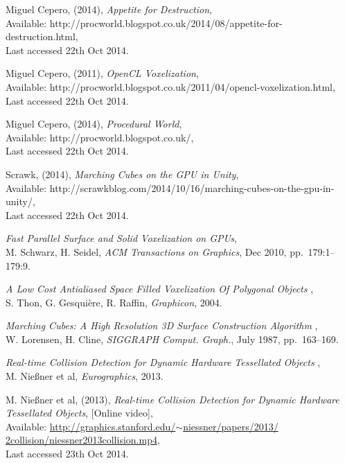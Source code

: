 
\begin{thebibliography}{99}



 Miguel Cepero, (2014), \emph{Appetite for Destruction},\\ Available: http://procworld.blogspot.co.uk/2014/08/appetite-for-destruction.html,\\ Last accessed 22th Oct 2014.

 Miguel Cepero, (2011), \emph{OpenCL Voxelization},\\ Available: http://procworld.blogspot.co.uk/2011/04/opencl-voxelization.html,\\ Last accessed 22th Oct 2014.

 Miguel Cepero, (2014), \emph{Procedural World},\\ Available: http://procworld.blogspot.co.uk/,\\ Last accessed 22th Oct 2014.

 Scrawk, (2014), \emph{Marching Cubes on the GPU in Unity},\\ Available: http://scrawkblog.com/2014/10/16/marching-cubes-on-the-gpu-in-unity/,\\ Last accessed 22th Oct 2014.

 \emph{Fast Parallel Surface and Solid Voxelization on GPUs},\\ M. Schwarz, H. Seidel, \emph{ACM Transactions on Graphics}, Dec 2010, pp.~179:1--179:9.

 \emph{A Low Cost Antialiased Space Filled Voxelization Of Polygonal Objects
},\\ S. Thon, G. Gesquière, R. Raffin, \emph{Graphicon}, 2004.

 \emph{Marching Cubes: A High Resolution 3D Surface Construction Algorithm
},\\ W. Lorensen, H. Cline, \emph{SIGGRAPH Comput. Graph.}, July 1987, pp.~163--169.

 \emph{Real-time Collision Detection for Dynamic Hardware Tessellated Objects
},\\ M. Nie{\ss}ner et al, \emph{Eurographics}, 2013.

 M. Nie{\ss}ner et al, (2013), \emph{Real-time Collision Detection for Dynamic Hardware Tessellated Objects}, [Online video],\\ Available: \href{http://graphics.stanford.edu/~niessner/papers/2013/2collision/niessner2013collision.mp4}{http://graphics.stanford.edu/$\sim$niessner/papers/2013/}\\\href{http://graphics.stanford.edu/~niessner/papers/2013/2collision/niessner2013collision.mp4}{2collision/niessner2013collision.mp4},\\ Last accessed 23th Oct 2014.

\end{thebibliography}
